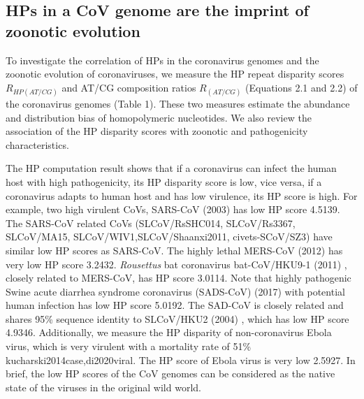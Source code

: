 \documentclass{article}
\numberwithin{equation}{section}
\begin{document}
\subsection{HPs in a CoV genome are the imprint of zoonotic evolution}
To investigate the correlation of HPs in the coronavirus genomes and the zoonotic evolution of coronaviruses, we measure the HP repeat disparity scores $R_{HP(AT/CG)}$ and AT/CG composition ratios $R_{(AT/CG)}$ (Equations 2.1 and 2.2) of the coronavirus genomes (Table 1). These two measures estimate the abundance and distribution bias of homopolymeric nucleotides. We also review the association of the HP disparity scores with zoonotic and pathogenicity characteristics.

The HP computation result shows that if a coronavirus can infect the human host with high pathogenicity, its HP disparity score is low, vice versa, if a coronavirus adapts to human host and has low virulence, its HP score is high. For example, two high virulent CoVs, SARS-CoV (2003) \citep{marra2003genome} has low HP score 4.5139. The SARS-CoV related CoVs (SLCoV/RsSHC014, SLCoV/Rs3367, SLCoV/MA15, SLCoV/WIV1,SLCoV/Shaanxi2011, civets-SCoV/SZ3) have similar low HP scores as SARS-CoV. The highly lethal MERS-CoV (2012) \citep{van2012genomic} has very low HP score 3.2432. \textit{Rousettus} bat coronavirus bat-CoV/HKU9-1 (2011) \citep{lau2010coexistence}, closely related to MERS-CoV, has HP score 3.0114. Note that highly pathogenic Swine acute diarrhea syndrome coronavirus (SADS-CoV) (2017) \citep{zhou2018fatal} with potential human infection \citep{edwards2020swine} has low HP score 5.0192. The SAD-CoV is closely related and shares 95\% sequence identity to SLCoV/HKU2 (2004) \citep{zhou2018fatal}, which has low HP score 4.9346. Additionally, we measure the HP disparity of non-coronavirus Ebola virus, which is very virulent with a mortality rate of 51\% {kucharski2014case,di2020viral}. The HP score of Ebola virus is very low 2.5927. In brief, the low HP scores of the CoV genomes can be considered as the native state of the viruses in the original wild world. 
\end{document}
